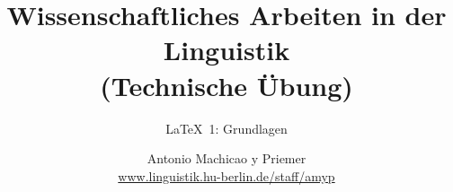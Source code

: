 


\title{
	Wissenschaftliches Arbeiten in der Linguistik\\
	(Technische Übung)
}

\subtitle{\LaTeX\ 1: Grundlagen}

\author[aMyP]{
	{\small Antonio Machicao y Priemer}
	\\
	{\footnotesize \url{www.linguistik.hu-berlin.de/staff/amyp}}
}








\begin{frame}
  \HUtitle
\end{frame}





\nocite{Freitag&MyP15a}
\nocite{Knuth1986}
\nocite{Kopka94a}
\nocite{MyP17c}
\nocite{MyP&Kerkhof16a}
	



